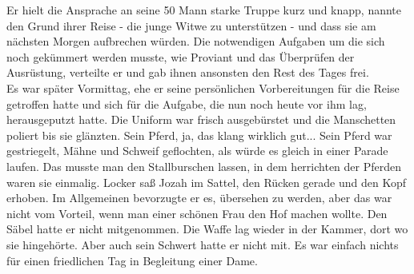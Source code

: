 Er hielt die Ansprache an seine 50 Mann starke Truppe kurz und knapp, nannte den Grund ihrer Reise 
- die junge Witwe zu unterstützen - und dass sie am nächsten Morgen aufbrechen würden. Die 
notwendigen Aufgaben um die sich noch gekümmert werden musste, wie Proviant und das Überprüfen der 
Ausrüstung, verteilte er und gab ihnen ansonsten den Rest des Tages frei.\\
Es war später Vormittag, ehe er seine persönlichen Vorbereitungen für die Reise getroffen hatte und 
sich für die Aufgabe, die nun noch heute vor ihm lag, herausgeputzt hatte. Die Uniform war 
frisch ausgebürstet und die Manschetten poliert bis sie glänzten. Sein Pferd, ja, das klang 
wirklich gut... Sein Pferd war gestriegelt, Mähne und Schweif geflochten, als würde es gleich in 
einer Parade laufen. Das musste man den Stallburschen lassen, in dem herrichten der Pferden waren 
sie einmalig. Locker saß Jozah im Sattel, den Rücken gerade und den Kopf erhoben. Im Allgemeinen 
bevorzugte er es, übersehen zu werden, aber das war nicht vom Vorteil, wenn man einer schönen Frau 
den Hof machen wollte. Den Säbel hatte er nicht mitgenommen. Die Waffe lag wieder in der Kammer, 
dort wo sie hingehörte. Aber auch sein Schwert hatte er nicht mit. Es war einfach nichts für 
einen friedlichen Tag in Begleitung einer Dame. \\

